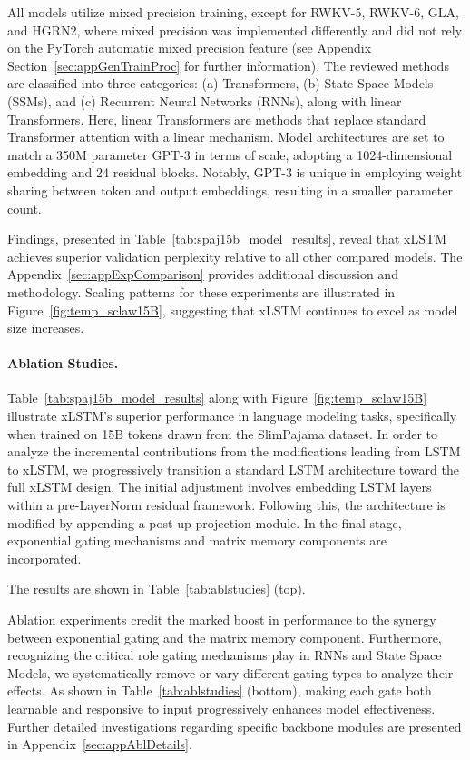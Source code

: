 All models utilize mixed precision training, except for RWKV-5, RWKV-6, GLA, and HGRN2, where mixed precision was implemented differently and did not rely on the PyTorch automatic mixed precision feature (see Appendix Section~\ref{sec:appGenTrainProc} for further information). The reviewed methods are classified into three categories: (a) Transformers, (b) State Space Models (SSMs), and (c) Recurrent Neural Networks (RNNs), along with linear Transformers. Here, linear Transformers are methods that replace standard Transformer attention with a linear mechanism. Model architectures are set to match a 350M parameter GPT-3 in terms of scale, adopting a 1024-dimensional embedding and 24 residual blocks. Notably, GPT-3 is unique in employing weight sharing between token and output embeddings, resulting in a smaller parameter count. 

Findings, presented in Table~\ref{tab:spaj15b_model_results}, reveal that xLSTM achieves superior validation perplexity relative to all other compared models. The Appendix~\ref{sec:appExpComparison} provides additional discussion and methodology. Scaling patterns for these experiments are illustrated in Figure~\ref{fig:temp_sclaw15B}, suggesting that xLSTM continues to excel as model size increases.

\paragraph{Ablation Studies.}
Table~\ref{tab:spaj15b_model_results} along with Figure~\ref{fig:temp_sclaw15B} illustrate xLSTM’s superior performance in language modeling tasks, specifically when trained on 15B tokens drawn from the SlimPajama dataset. In order to analyze the incremental contributions from the modifications leading from LSTM to xLSTM, we progressively transition a standard LSTM architecture toward the full xLSTM design. The initial adjustment involves embedding LSTM layers within a pre-LayerNorm residual framework. Following this, the architecture is modified by appending a post up-projection module. In the final stage, exponential gating mechanisms and matrix memory components are incorporated.

The results are shown in Table~\ref{tab:ablstudies} (top). 

Ablation experiments credit the marked boost in performance to the synergy between exponential gating and the matrix memory component. Furthermore, recognizing the critical role gating mechanisms play in RNNs and State Space Models, we systematically remove or vary different gating types to analyze their effects. As shown in Table~\ref{tab:ablstudies} (bottom), making each gate both learnable and responsive to input progressively enhances model effectiveness. Further detailed investigations regarding specific backbone modules are presented in Appendix~\ref{sec:appAblDetails}.

